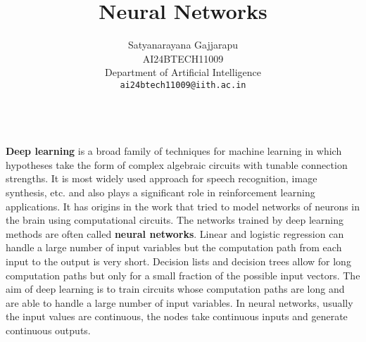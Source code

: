 \documentclass{article}
\title{Neural Networks}
\author{%
Satyanarayana Gajjarapu \\
AI24BTECH11009 \\
Department of Artificial Intelligence \\
\texttt{ai24btech11009@iith.ac.in} \\
}
\begin{document}
\maketitle
\begin{paragraph}
\\
\textbf{Deep learning} is a broad family of techniques for machine learning in which hypotheses take the form of complex algebraic circuits with tunable connection strengths. It is most widely used approach for speech recognition, image synthesis, etc. and also plays a significant role in reinforcement learning applications. It has origins in the work that tried to model networks of neurons in the brain using computational circuits. The networks trained by deep learning methods are often called \textbf{neural networks}. Linear and logistic regression can handle a large number of input variables but the computation path from each input to the output is very short. Decision lists and decision trees allow for long computation paths but only for a small fraction of the possible input vectors. The aim of deep learning is to train circuits whose computation paths are long and are able to handle a large number of input variables. In neural networks, usually the input values are continuous, the nodes take continuous inputs and generate continuous outputs.
\end{paragraph}
\end{document}
